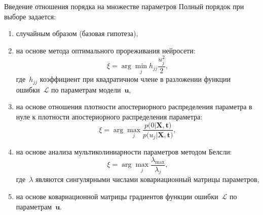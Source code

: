 \documentclass[10pt,pdf,hyperref={unicode}]{beamer}
\begin{document}
\begin{frame}{Введение отношения порядка на множестве параметров}
Полный порядок при выборе задается:
\begin{enumerate}[1)]
	\item случайным образом (базовая гипотеза),
	\item на основе метода оптимального прореживания нейросети:
	\[
	\xi = \arg \min_{j} h_{jj}\frac{u_j^2}{2},
	\]
	где~$h_{jj}$ коэффициент при квадратичном члене в разложении функции ошибки~$\mathcal{L}$ по параметрам модели~$\mathbf{u}$,
	\item на основе отношения плотности апостериорного распределения параметра в нуле к плотности апостериорного распределения параметра:
	\[
	\xi = \arg \max_{j} \frac{p\bigr(0|\mathbf{X}, \mathbf{t}\bigr)}{p\bigr(u_j|\mathbf{X}, \mathbf{t}\bigr)},
	\]
	\item на основе анализа мультиколиниарности параметров методом Белсли:
	\[
	\xi = \arg \max_{j} \frac{\lambda_{\max}}{\lambda_{j}}, 
	\]
	где~$\lambda$ являются сингулярными числами ковариационный матрицы параметров,
	\item на основе ковариационной матрицы градиентов функции ошибки~$\mathcal{L}$ по параметрам~$\mathbf{u}$.
	
\end{enumerate}
\end{frame}

\end{document}
